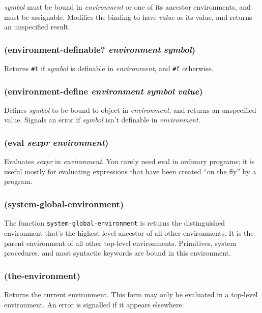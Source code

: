 \documentclass{article}
\begin{document}
\emph{symbol} must be bound in \emph{environment} or one of its ancestor environments, and
must be assignable. Modifies the binding to have \emph{value} as its value, and returns an
unspecified result.

\subsubsection{(environment-definable? \emph{environment} \emph{symbol})}

Returns \verb|#t| if \emph{symbol} is definable in \emph{environment}, and \verb|#f|
otherwise.

\subsubsection{(environment-define \emph{environment} \emph{symbol} \emph{value})}

Defines \emph{symbol} to be bound to object in \emph{environment}, and returns an unspecified
value. Signals an error if \emph{symbol} isn’t definable in \emph{environment}.

\subsubsection{(eval \emph{sexpr} \emph{environment})}

Evaluates \emph{sexpr} in \emph{environment}. You rarely need eval in ordinary programs; it is
useful mostly for evaluating expressions that have been created “on the fly” by a program.

\subsubsection{(system-global-environment)}

The function \verb|system-global-environment| is returns the distinguished environment
that’s the highest level ancestor of all other environments. It is the parent environment of
all other top-level environments. Primitives, system procedures, and most syntactic keywords
are bound in this environment.

\subsubsection{(the-environment)}

Returns the current environment. This form may only be evaluated in a top-level environment.
An error is signalled if it appears elsewhere.
\end{document}

